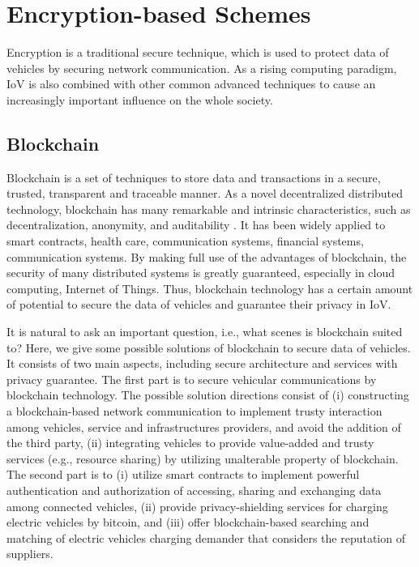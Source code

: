 \documentclass[journal,transmag,11pt]{IEEEtran}
\begin{document}
\section{Encryption-based Schemes}

Encryption is a traditional secure technique, which is used to protect data of vehicles by securing network communication. As a rising computing paradigm, IoV is also combined with other common advanced techniques to cause an increasingly important influence on the whole society.

\subsection{Blockchain}
Blockchain is a set of techniques to store data and transactions in a secure, trusted, transparent and traceable manner. As a novel decentralized distributed technology, blockchain has many remarkable and intrinsic characteristics, such as decentralization, anonymity, and auditability  \cite{journals/csur/LaoLHXGY20}. It has been widely applied to smart contracts, health care, communication systems, financial systems, communication systems. By making full use of the advantages of blockchain, the security of many distributed systems is greatly guaranteed, especially in cloud computing, Internet of Things. Thus, blockchain technology has a certain amount of potential to secure the data of vehicles and guarantee their privacy in IoV. 

It is natural to ask an important question, i.e., what scenes is blockchain suited to? Here, we give some possible solutions of blockchain to secure data of vehicles. It consists of two main aspects, including secure architecture and services with privacy guarantee. The first part is to secure vehicular communications by blockchain technology. The possible solution directions consist of (i) constructing a blockchain-based network communication to implement trusty interaction among vehicles, service and infrastructures providers, and avoid the addition of the third party, (ii) integrating vehicles to provide value-added and trusty services (e.g., resource sharing) by utilizing unalterable property of blockchain. The second part is to (i) utilize smart contracts to implement powerful authentication and authorization of accessing, sharing and exchanging data among connected vehicles, (ii) provide privacy-shielding services for charging electric vehicles by bitcoin, and (iii) offer blockchain-based searching and matching of electric vehicles charging demander that considers the reputation of suppliers.
\end{document}
